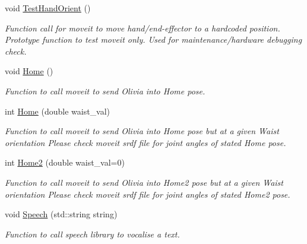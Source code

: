 \begin{DoxyCompactItemize}
\mbox{\label{structManipulate_a6d9060d7424ac225510e6d661ed2d8fb}} 
void \hyperlink{structManipulate_a6d9060d7424ac225510e6d661ed2d8fb}{Test\+Hand\+Orient} ()
\begin{DoxyCompactList}\small\item\em Function call for moveit to move hand/end-\/effector to a hardcoded position. Prototype function to test moveit only. Used for maintenance/hardware debugging check. \end{DoxyCompactList}\item 
\mbox{\label{structManipulate_ab6b6d749382344cbcfb7f93f9be8956b}} 
void \hyperlink{structManipulate_ab6b6d749382344cbcfb7f93f9be8956b}{Home} ()
\begin{DoxyCompactList}\small\item\em Function to call moveit to send Olivia into \textquotesingle{}Home\textquotesingle{} pose. \end{DoxyCompactList}\item 
int \hyperlink{structManipulate_a565b7ca35dd49f47e2bfed2ee9157555}{Home} (double waist\+\_\+val)
\begin{DoxyCompactList}\small\item\em Function to call moveit to send Olivia into \textquotesingle{}Home\textquotesingle{} pose but at a given Waist orientation Please check moveit srdf file for joint angles of stated \textquotesingle{}Home\textquotesingle{} pose. \end{DoxyCompactList}\item 
int \hyperlink{structManipulate_a2861a353de55f324c1d8c35941417698}{Home2} (double waist\+\_\+val=0)
\begin{DoxyCompactList}\small\item\em Function to call moveit to send Olivia into \textquotesingle{}Home2\textquotesingle{} pose but at a given Waist orientation Please check moveit srdf file for joint angles of stated \textquotesingle{}Home2\textquotesingle{} pose. \end{DoxyCompactList}\item 
void \hyperlink{structManipulate_a6d5bd85cd1be15a91afc75877718de08}{Speech} (std\+::string string)
\begin{DoxyCompactList}\small\item\em Function to call speech library to vocalise a text. \end{DoxyCompactList}\item 

\end{DoxyCompactItemize}
